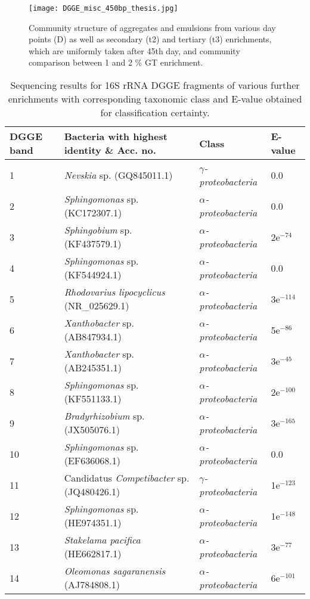 \documentclass[11pt]{article}
\begin{document}
\begin{figure}
\texttt{[image: DGGE\_misc\_450bp\_thesis.jpg]}
\caption{Community structure of aggregates and emulsions from various day points (D) as well as secondary (t2) and tertiary (t3) enrichments, which are uniformly taken after 45th day, and community comparison between 1 and 2 \% GT enrichment.}
\end{figure}

\begin{table}
\caption{Sequencing results for 16S rRNA DGGE fragments of various further enrichments with corresponding taxonomic class and E-value obtained for classification certainty.}
\begin{tabular}{ | l | p{7.8cm} | p{3cm} | l | }
\hline
DGGE band & Bacteria with highest identity \& Acc. no. & Class & E-value \\
\hline
1 & \emph{Nevskia} sp. (GQ845011.1) & \emph{$\gamma$-proteobacteria} & 0.0  \\
\hline
2 & \emph{Sphingomonas} sp. (KC172307.1) & \emph{$\alpha$-proteobacteria} & 0.0 \\
\hline
3 & \emph{Sphingobium} sp. (KF437579.1) & \emph{$\alpha$-proteobacteria} & 2e$^{-74}$ \\
\hline
4 & \emph{Sphingomonas} sp. (KF544924.1) & \emph{$\alpha$-proteobacteria} & 0.0  \\
\hline
5 & \emph{Rhodovarius lipocyclicus} (NR\_025629.1) & \emph{$\alpha$-proteobacteria} & 3e$^{-114}$ \\
\hline
6 & \emph{Xanthobacter} sp. (AB847934.1) & \emph{$\alpha$-proteobacteria} & 5e$^{-86}$  \\
\hline
7 & \emph{Xanthobacter} sp. (AB245351.1) & \emph{$\alpha$-proteobacteria} & 3e$^{-45}$  \\
\hline
8 & \emph{Sphingomonas} sp.(KF551133.1) & \emph{$\alpha$-proteobacteria} & 2e$^{-100}$  \\
\hline
9 & \emph{Bradyrhizobium} sp. (JX505076.1) & \emph{$\alpha$-proteobacteria} & 3e$^{-165}$  \\
\hline
10 & \emph{Sphingomonas} sp. (EF636068.1) & \emph{$\alpha$-proteobacteria} & 0.0  \\
\hline
11 & Candidatus \emph{Competibacter} sp. (JQ480426.1) & \emph{$\gamma$-proteobacteria} & 1e$^{-123}$  \\
\hline
12 & \emph{Sphingomonas} sp. (HE974351.1) & \emph{$\alpha$-proteobacteria} &  1e$^{-148}$ \\
\hline
13 & \emph{Stakelama pacifica} (HE662817.1) & \emph{$\alpha$-proteobacteria} & 3e$^{-77}$  \\
\hline
14 & \emph{Oleomonas sagaranensis} (AJ784808.1) & \emph{$\alpha$-proteobacteria} & 6e$^{-101}$  \\
\hline
\end{tabular}

\end{table}
\FloatBarrier
\end{document}
